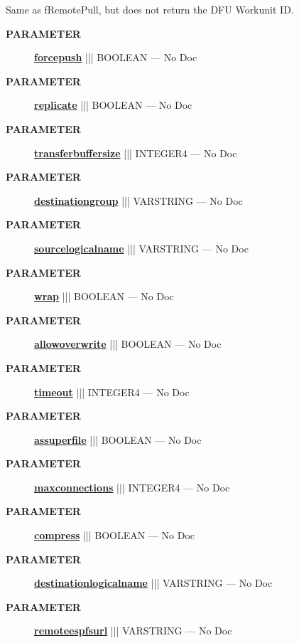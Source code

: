 \par





Same as fRemotePull, but does not return the DFU Workunit ID.






\par
\begin{description}
\item [\colorbox{tagtype}{\color{white} \textbf{\textsf{PARAMETER}}}] \textbf{\underline{forcepush}} ||| BOOLEAN --- No Doc
\item [\colorbox{tagtype}{\color{white} \textbf{\textsf{PARAMETER}}}] \textbf{\underline{replicate}} ||| BOOLEAN --- No Doc
\item [\colorbox{tagtype}{\color{white} \textbf{\textsf{PARAMETER}}}] \textbf{\underline{transferbuffersize}} ||| INTEGER4 --- No Doc
\item [\colorbox{tagtype}{\color{white} \textbf{\textsf{PARAMETER}}}] \textbf{\underline{destinationgroup}} ||| VARSTRING --- No Doc
\item [\colorbox{tagtype}{\color{white} \textbf{\textsf{PARAMETER}}}] \textbf{\underline{sourcelogicalname}} ||| VARSTRING --- No Doc
\item [\colorbox{tagtype}{\color{white} \textbf{\textsf{PARAMETER}}}] \textbf{\underline{wrap}} ||| BOOLEAN --- No Doc
\item [\colorbox{tagtype}{\color{white} \textbf{\textsf{PARAMETER}}}] \textbf{\underline{allowoverwrite}} ||| BOOLEAN --- No Doc
\item [\colorbox{tagtype}{\color{white} \textbf{\textsf{PARAMETER}}}] \textbf{\underline{timeout}} ||| INTEGER4 --- No Doc
\item [\colorbox{tagtype}{\color{white} \textbf{\textsf{PARAMETER}}}] \textbf{\underline{assuperfile}} ||| BOOLEAN --- No Doc
\item [\colorbox{tagtype}{\color{white} \textbf{\textsf{PARAMETER}}}] \textbf{\underline{maxconnections}} ||| INTEGER4 --- No Doc
\item [\colorbox{tagtype}{\color{white} \textbf{\textsf{PARAMETER}}}] \textbf{\underline{compress}} ||| BOOLEAN --- No Doc
\item [\colorbox{tagtype}{\color{white} \textbf{\textsf{PARAMETER}}}] \textbf{\underline{destinationlogicalname}} ||| VARSTRING --- No Doc
\item [\colorbox{tagtype}{\color{white} \textbf{\textsf{PARAMETER}}}] \textbf{\underline{remoteespfsurl}} ||| VARSTRING --- No Doc
\end{description}







